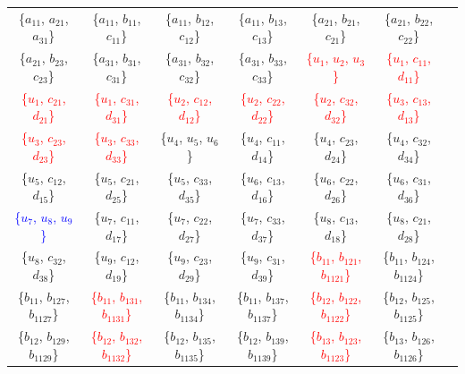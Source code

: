 \documentclass[%
  reprint,
  superscriptaddress,
  showpacs,
  showkeys,
  amsmath,amssymb,
  pra,
  longbibliography,
  floatfix,
  x11names
]{revtex4-2}
\begin{document}
\begin{table}[htbp!]
\begin{ruledtabular}
\begin{tabular}{ccccccc}
{\{$a_{11}$, $a_{21}$, $a_{31}$\}} & {\{$a_{11}$, $b_{11}$, $c_{11}$\}} & {\{$a_{11}$, $b_{12}$, $c_{12}$\}} & {\{$a_{11}$, $b_{13}$, $c_{13}$\}} & {\{$a_{21}$, $b_{21}$, $c_{21}$\}} & {\{$a_{21}$, $b_{22}$, $c_{22}$\}} \\
{\{$a_{21}$, $b_{23}$, $c_{23}$\}} & {\{$a_{31}$, $b_{31}$, $c_{31}$\}} & {\{$a_{31}$, $b_{32}$, $c_{32}$\}} & {\{$a_{31}$, $b_{33}$, $c_{33}$\}} & \textcolor{red}{\{$u_{1}$, $u_{2}$, $u_{3}$\}} & \textcolor{red}{\{$u_{1}$, $c_{11}$, $d_{11}$\}} \\
\textcolor{red}{\{$u_{1}$, $c_{21}$, $d_{21}$\}} & \textcolor{red}{\{$u_{1}$, $c_{31}$, $d_{31}$\}} & \textcolor{red}{\{$u_{2}$, $c_{12}$, $d_{12}$\}} & \textcolor{red}{\{$u_{2}$, $c_{22}$, $d_{22}$\}} & \textcolor{red}{\{$u_{2}$, $c_{32}$, $d_{32}$\}} & \textcolor{red}{\{$u_{3}$, $c_{13}$, $d_{13}$\}} \\
\textcolor{red}{\{$u_{3}$, $c_{23}$, $d_{23}$\}} & \textcolor{red}{\{$u_{3}$, $c_{33}$, $d_{33}$\}} & \textcolor{green!40!black}{\{$u_{4}$, $u_{5}$, $u_{6}$\}} & \{$u_{4}$, $c_{11}$, $d_{14}$\} & \{$u_{4}$, $c_{23}$, $d_{24}$\} & \{$u_{4}$, $c_{32}$, $d_{34}$\} \\
\{$u_{5}$, $c_{12}$, $d_{15}$\} & \{$u_{5}$, $c_{21}$, $d_{25}$\} & \{$u_{5}$, $c_{33}$, $d_{35}$\} & \{$u_{6}$, $c_{13}$, $d_{16}$\} & \{$u_{6}$, $c_{22}$, $d_{26}$\} & \{$u_{6}$, $c_{31}$, $d_{36}$\} \\
\textcolor{blue}{\{$u_{7}$, $u_{8}$, $u_{9}$\}} & \{$u_{7}$, $c_{11}$, $d_{17}$\} & \{$u_{7}$, $c_{22}$, $d_{27}$\} & \{$u_{7}$, $c_{33}$, $d_{37}$\} & \{$u_{8}$, $c_{13}$, $d_{18}$\} & \{$u_{8}$, $c_{21}$, $d_{28}$\} \\
\{$u_{8}$, $c_{32}$, $d_{38}$\} & \{$u_{9}$, $c_{12}$, $d_{19}$\} & \{$u_{9}$, $c_{23}$, $d_{29}$\} & \{$u_{9}$, $c_{31}$, $d_{39}$\} & \textcolor{red}{\{$b_{11}$, $b_{121}$, $b_{1121}$\}} & \{$b_{11}$, $b_{124}$, $b_{1124}$\} \\
\{$b_{11}$, $b_{127}$, $b_{1127}$\} & \textcolor{red}{\{$b_{11}$, $b_{131}$, $b_{1131}$\}} & \{$b_{11}$, $b_{134}$, $b_{1134}$\} & \{$b_{11}$, $b_{137}$, $b_{1137}$\} & \textcolor{red}{\{$b_{12}$, $b_{122}$, $b_{1122}$\}} & \{$b_{12}$, $b_{125}$, $b_{1125}$\} \\
\{$b_{12}$, $b_{129}$, $b_{1129}$\} & \textcolor{red}{\{$b_{12}$, $b_{132}$, $b_{1132}$\}} & \{$b_{12}$, $b_{135}$, $b_{1135}$\} & \{$b_{12}$, $b_{139}$, $b_{1139}$\} & \textcolor{red}{\{$b_{13}$, $b_{123}$, $b_{1123}$\}} & \{$b_{13}$, $b_{126}$, $b_{1126}$\} \\

\end{tabular}
\end{ruledtabular}
\end{table}
\end{document}
